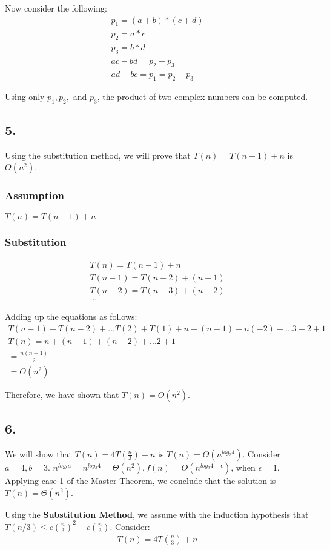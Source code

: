 \documentclass[11pt,letterpaper]{article}
\begin{document}
Now consider the following:
\begin{eqnarray}
	p_1 = (a + b) * (c + d) \\
	p_2 = a * c \\
	p_3 = b * d \\
	ac - bd = p_2 - p_3 \\
	ad + bc = p_1 = p_2 - p_3
\end{eqnarray}

Using only $ p_1, p_2, $ and $ p_3 $, the product of two complex numbers can be computed.


\subsection*{5.}
Using the substitution method, we will prove that $T(n) = T(n -1) + n $ is $O(n^2)$.

\subsubsection*{Assumption}
$T(n) = T(n-1) + n$

\subsubsection*{Substitution} 
\begin{eqnarray}
	T(n) = T(n-1) + n \\
	T(n-1) = T(n-2) + (n-1) \\
	T(n-2) = T(n-3) + (n-2) \\
	...
\end{eqnarray}

Adding up the equations as follows:
\begin{eqnarray}
	T(n-1) + T(n-2) + ... T(2) + T(1) + n + (n-1) + n(-2) + ... 3 + 2 +1 \\
	T(n) = n + (n-1) + (n-2) + ... 2 + 1 \\
	= \frac{n(n+1)}{2} \\
	= O(n^2)
\end{eqnarray}

Therefore, we have shown that $T(n) = O(n^2)$.


\subsection*{6.}
We will show that $ T(n) = 4 T( \frac{n}{3} ) + n $ is $ T(n) = \Theta(n^{log_{3}4 } ) $. Consider 
$ a = 4, b = 3$. $n^{log_b a} = n^{log_3 4} = \Theta(n^2), f(n) = O(n^{log_3 4 - \epsilon} )$, 
when $\epsilon = 1$. Applying case 1 of the Master Theorem, we conclude that the solution is 
$ T(n) = \Theta(n^2) $.

Using the \textbf{Substitution Method}, we assume with the induction hypothesis that 
$T(n/3) \le c(\frac{n}{3})^2 - c(\frac{n}{3})$. Consider:
\begin{eqnarray}
	T(n) = 4T(\frac{n}{3}) + n 
\end{eqnarray}
\end{document}
